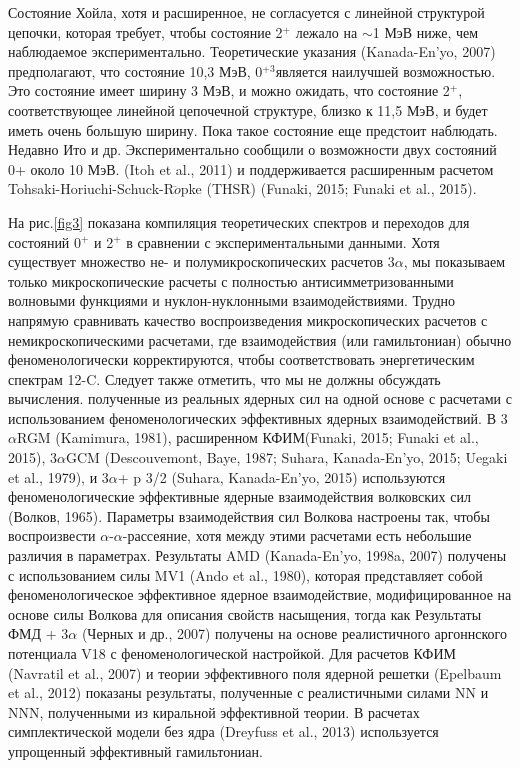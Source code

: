 \documentclass[fontsize=14pt]{scrreport}
\begin{document}
Состояние Хойла, хотя и расширенное, не согласуется с линейной структурой цепочки, которая требует, чтобы состояние 2$^{+}$ лежало на $\sim$1 МэВ ниже, чем наблюдаемое экспериментально. Теоретические указания (Kanada-En'yo, 2007) предполагают, что состояние 10,3 МэВ, 0$^{+3}$является наилучшей возможностью. Это состояние имеет ширину 3 МэВ, и можно ожидать, что состояние 2$^{+}$, соответствующее линейной цепочечной структуре, близко к 11,5 МэВ, и будет иметь очень большую ширину. Пока такое состояние еще предстоит наблюдать. Недавно Ито и др. Экспериментально сообщили о возможности двух состояний 0+ около 10 МэВ. (Itoh et al., 2011) и поддерживается расширенным расчетом Tohsaki-Horiuchi-Schuck-R$\ddot{o}$pke (THSR) (Funaki, 2015; Funaki et al., 2015).

На рис.\ref{fig3} показана компиляция теоретических спектров и переходов для состояний 0$^{+}$ и 2$^{+}$ в сравнении с экспериментальными данными. Хотя существует множество не- и полумикроскопических расчетов 3$\alpha$, мы показываем только микроскопические расчеты с полностью антисимметризованными волновыми функциями и нуклон-нуклонными взаимодействиями. Трудно напрямую сравнивать качество воспроизведения микроскопических расчетов с немикроскопическими расчетами, где взаимодействия (или гамильтониан) обычно феноменологически корректируются, чтобы соответствовать энергетическим спектрам 12-C. Следует также отметить, что мы не должны обсуждать  вычисления. полученные из реальных ядерных сил на одной основе с расчетами с использованием феноменологических эффективных ядерных взаимодействий.  В 3$\alpha$RGM (Kamimura, 1981), расширенном КФИМ(Funaki, 2015; Funaki et al., 2015), 3$\alpha$GCM (Descouvemont, Baye, 1987; Suhara, Kanada-En'yo, 2015; Uegaki et al., 1979), и 3$\alpha$+ p 3/2 (Suhara, Kanada-En'yo, 2015) используются феноменологические эффективные ядерные взаимодействия волковских сил (Волков, 1965). Параметры взаимодействия сил Волкова настроены так, чтобы воспроизвести $\alpha$-$\alpha$-рассеяние, хотя между этими расчетами есть небольшие различия в параметрах. Результаты AMD (Kanada-En'yo, 1998a, 2007) получены с использованием силы MV1 (Ando et al., 1980), которая представляет собой феноменологическое эффективное ядерное взаимодействие, модифицированное на основе силы Волкова для описания свойств насыщения, тогда как Результаты ФМД + 3$\alpha$ (Черных и др., 2007) получены на основе реалистичного аргоннского потенциала V18 с феноменологической настройкой. Для расчетов КФИМ (Navratil et al., 2007) и теории эффективного поля ядерной решетки (Epelbaum et al., 2012) показаны результаты, полученные с реалистичными силами NN и NNN, полученными из киральной эффективной теории. В расчетах симплектической модели без ядра (Dreyfuss et al., 2013) используется упрощенный эффективный гамильтониан.
\end{document}
